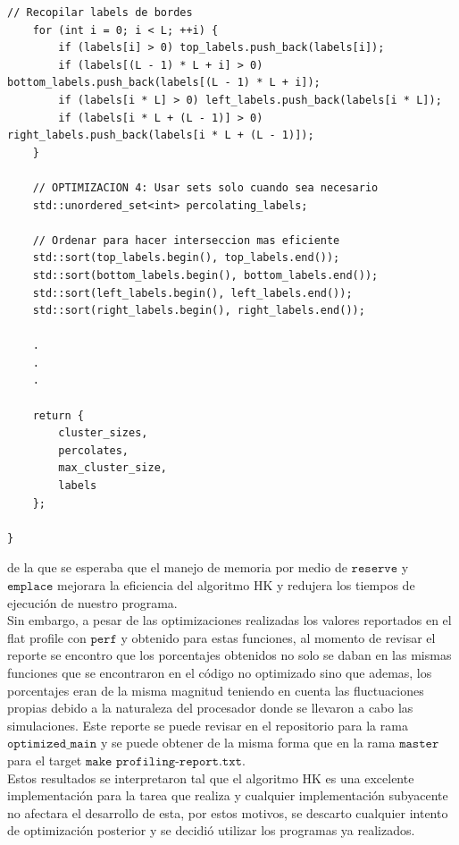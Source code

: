 \documentclass[12pt,a4paper]{article}
\begin{document}
\begin{lstlisting}[style=cpp-style]
    // Recopilar labels de bordes
    for (int i = 0; i < L; ++i) {
        if (labels[i] > 0) top_labels.push_back(labels[i]);
        if (labels[(L - 1) * L + i] > 0) bottom_labels.push_back(labels[(L - 1) * L + i]);
        if (labels[i * L] > 0) left_labels.push_back(labels[i * L]);
        if (labels[i * L + (L - 1)] > 0) right_labels.push_back(labels[i * L + (L - 1)]);
    }

    // OPTIMIZACION 4: Usar sets solo cuando sea necesario
    std::unordered_set<int> percolating_labels;
    
    // Ordenar para hacer interseccion mas eficiente
    std::sort(top_labels.begin(), top_labels.end());
    std::sort(bottom_labels.begin(), bottom_labels.end());
    std::sort(left_labels.begin(), left_labels.end());
    std::sort(right_labels.begin(), right_labels.end());

    .
    .
    .

    return {
        cluster_sizes,
        percolates,
        max_cluster_size,
        labels
    };
    
}
\end{lstlisting}

de la que se esperaba que el manejo de memoria por medio de $\texttt{reserve}$ y $\texttt{emplace}$ mejorara la eficiencia del algoritmo HK y redujera los tiempos de ejecución de nuestro programa.
\\

Sin embargo, a pesar de las optimizaciones realizadas los valores reportados en el flat profile con $\texttt{perf}$ y obtenido para estas funciones, al momento de revisar el reporte se encontro que los porcentajes obtenidos no solo se daban en las mismas funciones que se encontraron en el código no optimizado sino que ademas, los porcentajes eran de la misma magnitud teniendo en cuenta las fluctuaciones propias debido a la naturaleza del procesador donde se llevaron a cabo las simulaciones. Este reporte se puede revisar en el repositorio para la rama $\texttt{optimized\_main}$ y se puede obtener de la misma forma que en la rama $\texttt{master}$ para el target $\texttt{$\texttt{make profiling-report.txt}$}$.
\\

Estos resultados se interpretaron tal que el algoritmo HK es una excelente implementación para la tarea que realiza y cualquier implementación subyacente no afectara el desarrollo de esta, por estos motivos, se descarto cualquier intento de optimización posterior y se decidió utilizar los programas ya realizados.
\end{document}
